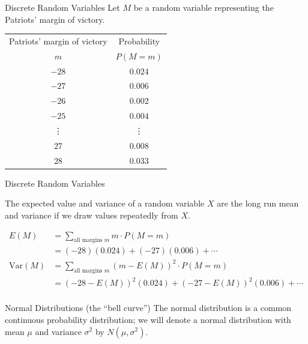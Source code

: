 \documentclass{beamer}\usepackage[]{graphicx}\usepackage[]{color}
\begin{document}
\begin{darkframes}
\begin{frame}[fragile]{Discrete Random Variables}
Let $M$ be a random variable representing the Patriots' margin of victory.
\begin{center}
  \begin{tabular}{cc}
    Patriots' margin of victory & Probability \\
    $m$ & $P(M=m)$ \\
    \hline
    $-28$ & $0.024$ \\
    $-27$ & $0.006$ \\
    $-26$ & $0.002$ \\
    $-25$ & $0.004$ \\
    \vdots & \vdots \\
    $27$ & $0.008$ \\
    $28$ & $0.033$ \\
  \end{tabular}
\end{center}
\end{frame}

\begin{frame}[fragile]{Discrete Random Variables}

\begin{definition}
  The \alert{expected value} and \alert{variance} of a random variable $X$ are the long run mean and variance if we draw values repeatedly from $X$.
\end{definition}

\pause
\begin{align*}
  E(M) &= \sum_{\text{all margins $m$}} m \cdot P(M=m) \\
  &= (-28)(0.024) +
     (-27)(0.006) + \cdots \\
  \text{Var}(M) &= \sum_{\text{all margins $m$}} (m-E(M))^2 \cdot P(M=m) \\
  &= (-28-E(M))^2(0.024) +
     (-27-E(M))^2(0.006) + \cdots \\
\end{align*}
\end{frame}


\begin{frame}{Normal Distributions (the ``bell curve'')}
The \alert{normal distribution} is a common continuous probability distribution;
we will denote a normal distribution with mean $\mu$ and variance $\sigma^2$ by $N(\mu,\sigma^2)$.
\end{frame}


\end{darkframes}
\end{document}
